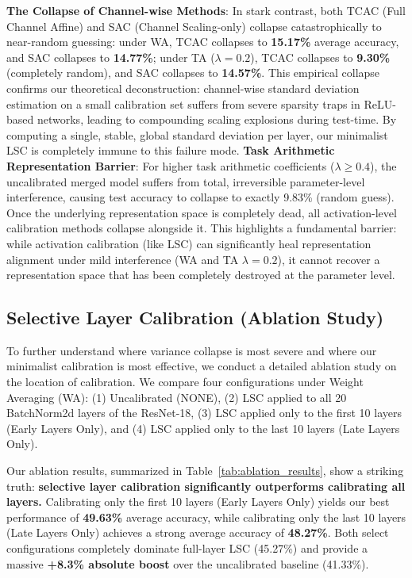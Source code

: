 \documentclass{article}
\theoremstyle{plain}
\theoremstyle{definition}
\theoremstyle{remark}
\begin{document}
\textbf{The Collapse of Channel-wise Methods}: In stark contrast, both TCAC (Full Channel Affine) and SAC (Channel Scaling-only) collapse catastrophically to near-random guessing: under WA, TCAC collapses to \textbf{15.17\%} average accuracy, and SAC collapses to \textbf{14.77\%}; under TA ($\lambda=0.2$), TCAC collapses to \textbf{9.30\%} (completely random), and SAC collapses to \textbf{14.57\%}. This empirical collapse confirms our theoretical deconstruction: channel-wise standard deviation estimation on a small calibration set suffers from severe sparsity traps in ReLU-based networks, leading to compounding scaling explosions during test-time. By computing a single, stable, global standard deviation per layer, our minimalist LSC is completely immune to this failure mode.
\textbf{Task Arithmetic Representation Barrier}: For higher task arithmetic coefficients ($\lambda \ge 0.4$), the uncalibrated merged model suffers from total, irreversible parameter-level interference, causing test accuracy to collapse to exactly 9.83\% (random guess). Once the underlying representation space is completely dead, all activation-level calibration methods collapse alongside it. This highlights a fundamental barrier: while activation calibration (like LSC) can significantly heal representation alignment under mild interference (WA and TA $\lambda=0.2$), it cannot recover a representation space that has been completely destroyed at the parameter level.

\subsection{Selective Layer Calibration (Ablation Study)}
\label{sec:ablation}
To further understand where variance collapse is most severe and where our minimalist calibration is most effective, we conduct a detailed ablation study on the location of calibration. We compare four configurations under Weight Averaging (WA): (1) Uncalibrated (NONE), (2) LSC applied to all 20 BatchNorm2d layers of the ResNet-18, (3) LSC applied only to the first 10 layers (Early Layers Only), and (4) LSC applied only to the last 10 layers (Late Layers Only). 

Our ablation results, summarized in Table~\ref{tab:ablation_results}, show a striking truth: \textbf{selective layer calibration significantly outperforms calibrating all layers.} Calibrating only the first 10 layers (Early Layers Only) yields our best performance of \textbf{49.63\%} average accuracy, while calibrating only the last 10 layers (Late Layers Only) achieves a strong average accuracy of \textbf{48.27\%}. Both select configurations completely dominate full-layer LSC (45.27\%) and provide a massive \textbf{+8.3\% absolute boost} over the uncalibrated baseline (41.33\%).
\end{document}
